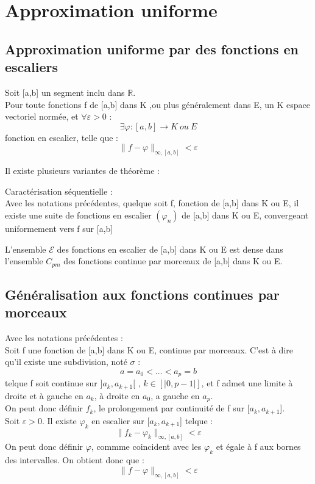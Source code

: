 \chapter{Approximation uniforme}
\section{Approximation uniforme par des fonctions en escaliers}
\begin{theo}
Soit [a,b] un segment inclu dans $\mathbb{R}$.\\
Pour toute fonctions f de [a,b] dans K ,ou plus généralement dans E, un K espace vectoriel normée, et $\forall \varepsilon > 0$ :
$$\exists \varphi : [a,b] \rightarrow K~ ou~ E$$
fonction en escalier, telle que : 
$$\parallel f - \varphi \parallel_{\infty,[a,b]} < \varepsilon $$
\end{theo}
Il existe plusieurs variantes de théorème :
\begin{theo}
Caractérisation séquentielle : \\
Avec les notations précédentes, quelque soit f, fonction de [a,b] dans K ou E, il existe une suite de fonctions en escalier $(\varphi_n)$ de [a,b] dans K ou E, convergeant uniformement vers f sur [a,b]
\end{theo}
\begin{theo}
L'ensemble $\mathcal{E}$ des fonctions en escalier de [a,b] dans K ou E est dense dans l'ensemble $C_{pm}$ des fonctions continue par morceaux de [a,b] dans K ou E.
\end{theo}
\section{Généralisation aux fonctions continues par morceaux}
Avec les notations précédentes :\\
Soit f une fonction de [a,b] dans K ou E, continue par morceaux. C'est à dire qu'il existe une subdivision, noté $\sigma$ :
$$a = a_0 < \dots < a_p = b$$
telque f soit continue sur $]a_k,a_{k+1}[$ , $k \in [|0,p-1|]$, et f admet une limite à droite et à gauche en $a_k$, à droite en $a_0$, a gauche en $a_p$.\\
On peut donc définir $f_k$, le prolongement par continuité de f sur [$a_k,a_{k+1}$].\\
Soit $\varepsilon > 0$. Il existe $\varphi_k$ en escalier sur [$a_k,a_{k+1}$] telque : 
$$\parallel f_k - \varphi_k \parallel_{\infty,[a,b]} < \varepsilon $$
On peut donc définir $\varphi$, commme coincident avec les $\varphi_k$ et égale à f aux bornes des intervalles. On obtient donc que : 
$$\parallel f - \varphi \parallel_{\infty,[a,b]} < \varepsilon $$
